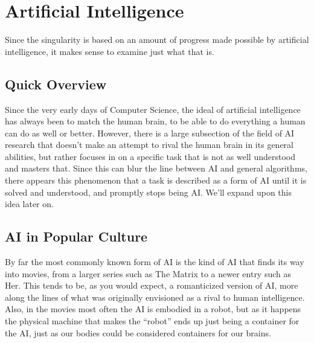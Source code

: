 \documentclass[12pt]{article} %
\begin{document}

\section{Artificial Intelligence} %

Since the singularity is based on an amount of progress made possible by artificial intelligence, it makes sense to examine just what that is.


\subsection{Quick Overview} %

Since the very early days of Computer Science, the ideal of artificial intelligence has always been to match the human brain, to be able to do everything a human can do as well or better. However, there is a large subsection of the field of AI research that doesn't make an attempt to rival the human brain in its general abilities, but rather focuses in on a specific task that is not as well understood and masters that. Since this can blur the line between AI and general algorithms, there appears this phenomenon that a task is described as a form of AI until it is solved and understood, and promptly stops being AI. We'll expand upon this idea later on.


\subsection{AI in Popular Culture}

By far the most commonly known form of AI is the kind of AI that finds its way into movies, from a larger series such as The Matrix to a newer entry such as Her. This tends to be, as you would expect, a romanticized version of AI, more along the lines of what was originally envisioned as a rival to human intelligence. Also, in the movies most often the AI is embodied in a robot, but as it happens the physical machine that makes the ``robot'' ends up just being a container for the AI, just as our bodies could be considered containers for our brains.
\end{document}
